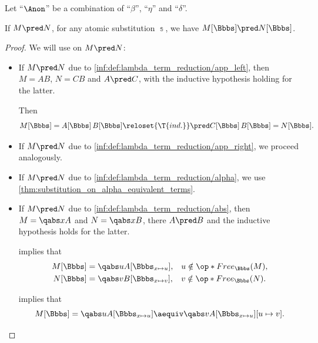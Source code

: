 \begin{proposition}\label{thm:substitution_on_single_step_reduction}
  Let \enquote{\( {\Anon} \)} be a combination of \enquote{\( \beta \)}, \enquote{\( \eta \)} and \enquote{\( \delta \)}.

  If \( M \pred N \), for any atomic substitution \( \Bbbs \), we have \( M[\Bbbs] \pred N[\Bbbs] \).
\end{proposition}
\begin{proof}
  We will use  on \( M \pred N \):
  \begin{itemize}
    \item If \( M \pred N \) due to \ref{inf:def:lambda_term_reduction/app_left}, then \( M = AB \), \( N = CB \) and \( A \pred C \), with the inductive hypothesis holding for the latter.

    Then
    \begin{equation*}
      M[\Bbbs]
      =
      A[\Bbbs] \thinspace B[\Bbbs]
      \reloset{\T{ind.}} \pred
      C[\Bbbs] \thinspace B[\Bbbs]
      =
      N[\Bbbs].
    \end{equation*}

    \item If \( M \pred N \) due to \ref{inf:def:lambda_term_reduction/app_right}, we proceed analogously.

    \item If \( M \pred N \) due to \ref{inf:def:lambda_term_reduction/alpha}, we use \cref{thm:substitution_on_alpha_equivalent_terms}.

    \item If \( M \pred N \) due to \ref{inf:def:lambda_term_reduction/abs}, then \( M = \qabs x A \) and \( N = \qabs x B \), there \( A \pred B \) and the inductive hypothesis holds for the latter.

     implies that
    \begin{align*}
      M[\Bbbs] &= \qabs u A[\Bbbs_{x \mapsto u}], &&u \notin \op*{Free}_\Bbbs(M), \\
      N[\Bbbs] &= \qabs v B[\Bbbs_{x \mapsto v}], &&v \notin \op*{Free}_\Bbbs(N).
    \end{align*}

     implies that
    \begin{equation*}
      M[\Bbbs] = \qabs u A[\Bbbs_{x \mapsto u}] \aequiv \qabs v A[\Bbbs_{x \mapsto u}][u \mapsto v].
    \end{equation*}


\end{itemize}
\end{proof}

